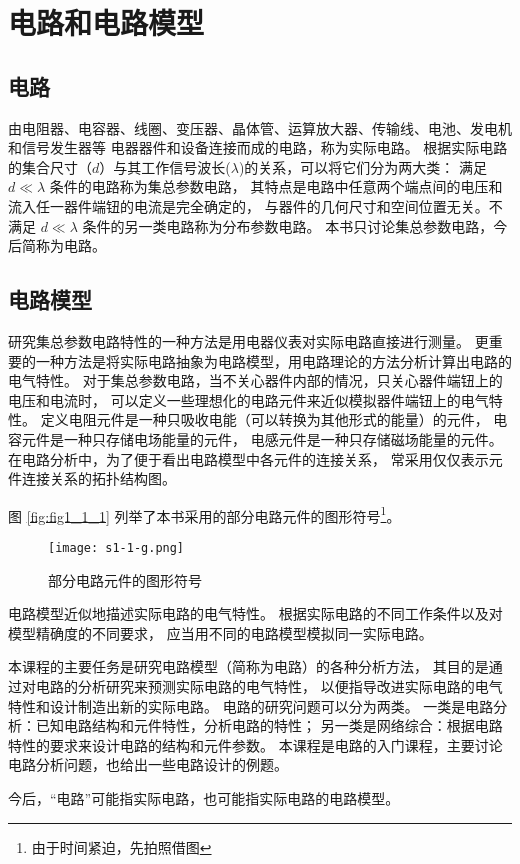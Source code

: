 \section{电路和电路模型}

\subsection{电路}
由电阻器、电容器、线圈、变压器、晶体管、运算放大器、传输线、电池、发电机和信号发生器等
电器器件和设备连接而成的电路，称为实际电路。
根据实际电路的集合尺寸（$d$）与其工作信号波长($\lambda$)的关系，可以将它们分为两大类：
满足 $d\ll\lambda$ 条件的电路称为集总参数电路，
其特点是电路中任意两个端点间的电压和流入任一器件端钮的电流是完全确定的，
与器件的几何尺寸和空间位置无关。不满足 $d\ll\lambda$ 条件的另一类电路称为分布参数电路。
本书只讨论集总参数电路，今后简称为电路。

\subsection{电路模型}
研究集总参数电路特性的一种方法是用电器仪表对实际电路直接进行测量。
更重要的一种方法是将实际电路抽象为电路模型，用电路理论的方法分析计算出电路的电气特性。
对于集总参数电路，当不关心器件内部的情况，只关心器件端钮上的电压和电流时，
可以定义一些理想化的电路元件来近似模拟器件端钮上的电气特性。
定义电阻元件是一种只吸收电能（可以转换为其他形式的能量）的元件，
电容元件是一种只存储电场能量的元件，
电感元件是一种只存储磁场能量的元件。
在电路分析中，为了便于看出电路模型中各元件的连接关系，
常采用仅仅表示元件连接关系的拓扑结构图。

图 \ref{fig:fig1_1_1} 列举了本书采用的部分电路元件的图形符号\footnote{由于时间紧迫，先拍照借图}。

\begin{figure}[htbp]
\centering
\texttt{[image: s1-1-g.png]}
\caption{部分电路元件的图形符号}\label{fig1_1_1}
\end{figure}

电路模型近似地描述实际电路的电气特性。
根据实际电路的不同工作条件以及对模型精确度的不同要求，
应当用不同的电路模型模拟同一实际电路。

本课程的主要任务是研究电路模型（简称为电路）的各种分析方法，
其目的是通过对电路的分析研究来预测实际电路的电气特性，
以便指导改进实际电路的电气特性和设计制造出新的实际电路。
电路的研究问题可以分为两类。
一类是电路分析：已知电路结构和元件特性，分析电路的特性；
另一类是网络综合：根据电路特性的要求来设计电路的结构和元件参数。
本课程是电路的入门课程，主要讨论电路分析问题，也给出一些电路设计的例题。

今后，“电路”可能指实际电路，也可能指实际电路的电路模型。
